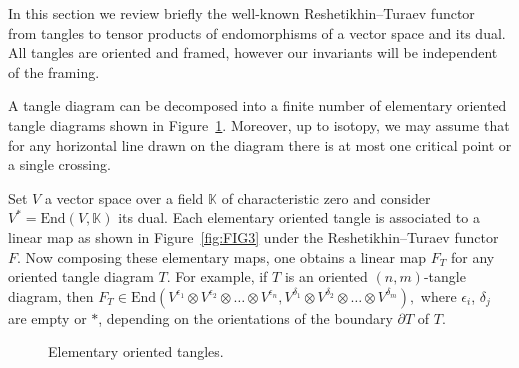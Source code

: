 \documentclass[pdftex]{sigma}
\numberwithin{equation}{section}
\theoremstyle{definition}
\begin{document}
In this section we review briefly the well-known Reshetikhin--Turaev functor
~\cite{RT,Tu:book} from tangles to tensor products of endomorphisms of a vector
space and its dual. All tangles are oriented and framed, however our invariants
will be independent of the framing.

A tangle diagram can be decomposed into a finite number of elementary
oriented tangle diagrams shown in Figure~\ref{fig:tangles1}. Moreover, up to
 isotopy, we may assume that for any horizontal line drawn on the diagram there is
 at most one critical point or a single crossing.

Set $V$ a vector space over a field $\mathbb{K}$ of characteristic zero and consider
$V^\ast = \mathrm{End}(V,\mathbb{K})$ its dual. Each elementary oriented tangle is associated
to a linear map as shown in Figure~\ref{fig:FIG3} under the Reshetikhin--Turaev functor
$F$. Now composing these elementary maps, one obtains a linear map $F_T$
for any oriented tangle diagram $T$.
For example, if $T$ is an oriented $(n,m)$-tangle diagram, then
$
F_{T} \in \mathrm{End}(V^{\epsilon_1} \otimes V^{\epsilon_2} \otimes \dots
\otimes V^{\epsilon_n}, V^{\delta_1} \otimes V^{\delta_2} \otimes \dots
\otimes V^{\delta_m}) ,
$
where $\epsilon_i$, $\delta_j$ are empty or $\ast$, depending on the
orientations of the boundary $\partial T$ of $T$.

\begin{figure}[htpb!]\centering
{}
\caption{Elementary oriented tangles.}
\label{fig:tangles1}
\end{figure}
\end{document}

